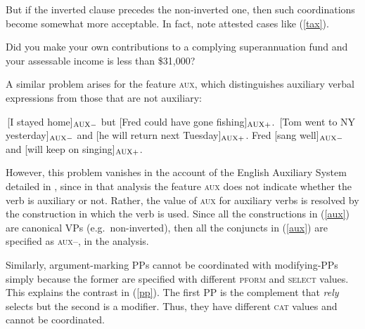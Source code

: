 \documentclass[output=paper]{langsci/langscibook}
\begin{document}
\begin{exe}
\ex \begin{xlista}
\end{xlista}
\end{exe}

\noindent
But if the inverted clause precedes the non-inverted one, then such coordinations become somewhat more acceptable. In fact,  \citet[1332--1333]{rodney2} note attested cases like 
(\ref{tax}).

\begin{exe}
\ex Did you make your own contributions to a complying superannuation fund and
your assessable income is less than \$31,000?\label{tax}
\end{exe}

\noindent
A similar problem arises for the feature \textsc{aux}, which distinguishes auxiliary verbal expressions from those that
are not auxiliary:

\begin{exe}
\ex
\begin{xlista}
\ex \,[I stayed home]$_{\textup{\scriptsize AUX} -}$ but [Fred could have gone fishing]$_{\textup{\scriptsize AUX} +}$.
\ex \,[Tom went to NY yesterday]$_{\textup{\scriptsize AUX} -}$ and [he will return next Tuesday]$_{\textup{\scriptsize AUX} +}$.
\ex Fred [sang well]$_{\textup{\scriptsize AUX} -}$ and [will keep on singing]$_{\textup{\scriptsize AUX} +}$.
\end{xlista}\label{aux}
\end{exe}

\noindent
However, this problem vanishes in the account of the English Auxiliary System detailed in \citet{SagEtAl20}, since in that analysis
the feature \textsc{aux} does not indicate whether the verb is auxiliary or not. Rather, the value of \textsc{aux} for auxiliary verbs is resolved by the construction in which the verb is used. Since all the constructions in (\ref{aux}) are canonical VPs (e.g.\ non-inverted), then 
all the conjuncts in (\ref{aux}) are specified as \textsc{aux--}, in
the \citet{SagEtAl20} analysis.




Similarly, argument-marking PPs cannot be coordinated with modifying-PPs simply because the former are specified with different  \textsc{pform} and \textsc{select} values. This explains the contrast
in (\ref{pp}). The first PP is the complement that \emph{rely}
selects but the second is a modifier. Thus, they have different \textsc{cat} values 
and cannot be coordinated.
\end{document}
